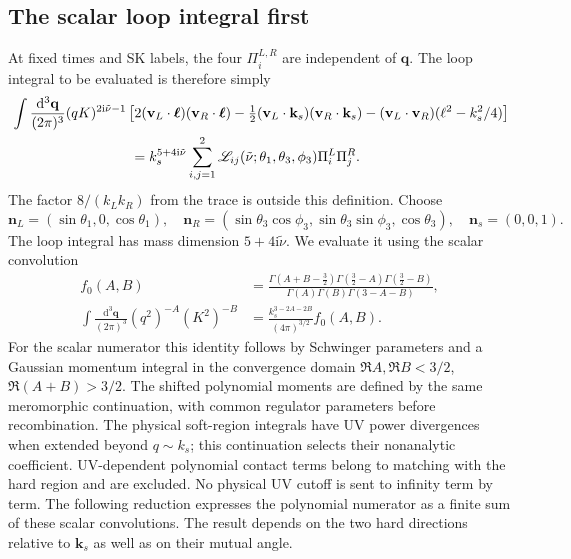 \documentclass[a4paper,12pt]{article}
\newcommand{\ii}{\mathrm i}
\newcommand{\mb}{\mathbf}
\newcommand{\tn}{\tilde\nu}
\newcommand{\di}{\mathrm d}
\newcommand{\bq}{\mb q}
\newcommand{\bk}{\mb k}
\begin{document}
\subsection{The scalar loop integral first}
\label{sec:loop-first}
At fixed times and SK labels, the four $\Pi^{L,R}_i$ are independent
of $\bq$. The loop integral to be evaluated is therefore simply
\begin{align}
 &\int\frac{\di^3\bq}{(2\pi)^3}(qK)^{2\ii\tn-1}
 \left[2(\mb v_L\cdot\bm\ell)(\mb v_R\cdot\bm\ell)
 -\tfrac12(\mb v_L\cdot\bk_s)(\mb v_R\cdot\bk_s)
 -(\mb v_L\cdot\mb v_R)(\ell^2-k_s^2/4)\right]\nonumber\\
 &\hspace{30mm}
 =k_s^{5+4\ii\tn}\sum_{i,j=1}^2
       \mathscr L_{ij}(\tn;\theta_1,\theta_3,\phi_3)\Pi^L_i\Pi^R_j .
 \label{eq:spin-bubble}
\end{align}
The factor $8/(k_Lk_R)$ from the trace is outside this definition.
Choose
\[
 \mb n_L=(\sin\theta_1,0,\cos\theta_1),\quad
 \mb n_R=(\sin\theta_3\cos\phi_3,\sin\theta_3\sin\phi_3,\cos\theta_3),
 \quad\mb n_s=(0,0,1).
\]
The loop integral has mass dimension $5+4\ii\tn$.
We evaluate it using the scalar convolution
\begin{align}
 f_0(A,B)&=\frac{\Gamma(A+B-\tfrac32)\Gamma(\tfrac32-A)\Gamma(\tfrac32-B)}
 {\Gamma(A)\Gamma(B)\Gamma(3-A-B)},\\
 \int\frac{\di^3\bq}{(2\pi)^3}(q^2)^{-A}(K^2)^{-B}
 &=\frac{k_s^{3-2A-2B}}{(4\pi)^{3/2}}f_0(A,B).
 \label{eq:scalar-bubble}
\end{align}
For the scalar numerator this identity follows by Schwinger parameters
and a Gaussian momentum integral in the convergence domain
$\Re A,\Re B<3/2$, $\Re(A+B)>3/2$. The shifted polynomial moments
are defined by the same meromorphic continuation, with common regulator
parameters before recombination. The physical soft-region integrals have
UV power divergences when extended beyond $q\sim k_s$; this continuation
selects their nonanalytic coefficient. UV-dependent polynomial contact
terms belong to matching with the hard region and are excluded.
No physical UV cutoff is sent to infinity term by term.
The following reduction expresses the polynomial numerator as a finite
sum of these scalar convolutions. The result depends on the two hard
directions relative to $\bk_s$ as well as on their mutual angle.
\end{document}
